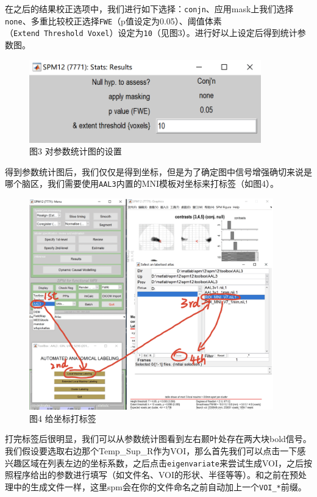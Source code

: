 \documentclass[
]{article}
\begin{document}
在之后的结果校正选项中，我们进行如下选择：\texttt{conj\textquotesingle{}n}、应用mask上我们选择\texttt{none}、多重比较校正选择\texttt{FWE}（p值设定为0.05）、阈值体素（\texttt{Extend\ Threshold\ Voxel}）设定为\texttt{10}（见图3）。进行好以上设定后得到统计参数图。

\begin{figure}
\centering
\includegraphics[width=3.95833in,height=\textheight]{VOI_step2.png}
\caption{图3 对参数统计图的设置}
\end{figure}

得到参数统计图后，我们仅仅是得到坐标，但是为了确定图中信号增强确切来说是哪个脑区，我们需要使用\texttt{AAL3}内置的MNI模板对坐标来打标签（如图4）。

\begin{figure}
\centering
\includegraphics[width=4.16667in,height=\textheight]{VOI_step3.png}
\caption{图4 给坐标打标签}
\end{figure}

打完标签后很明显，我们可以从参数统计图看到左右颞叶处存在两大块bold信号。我们假设要选取右边那个Temp\_Sup\_R作为VOI，那么首先我们可以点击一下感兴趣区域在列表左边的坐标系数，之后点击\texttt{eigenvariate}来尝试生成VOI，之后按照程序给出的参数进行填写（如文件名、VOI的形状、半径等等）。和之前在预处理中的生成文件一样，这里spm会在你的文件命名之前自动加上一个\texttt{VOI\_*}前缀。
\end{document}
